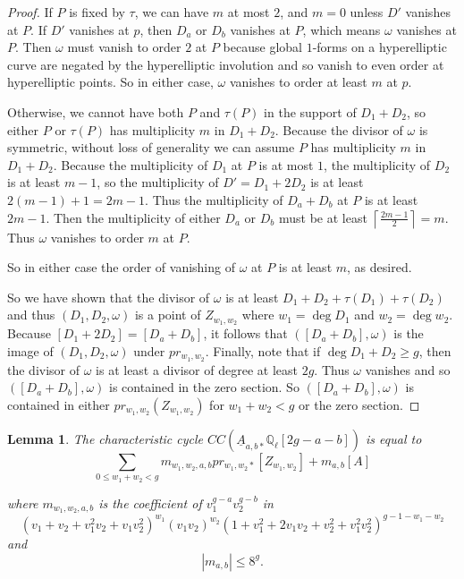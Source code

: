 \documentclass[12pt]{amsart}
\newtheorem{lemma}[theorem]{Lemma}
\theoremstyle{definition}
\theoremstyle{remark}
\begin{document}
\begin{proof}
If $P$ is fixed by $\tau$, we can have $m$ at most $2$, and $m=0$ unless $D'$ vanishes at $P$. If $D'$ vanishes at $p$, then $D_a$ or $D_b$ vanishes at $P$, which means $\omega$ vanishes at $P$. Then $\omega$ must vanish to order $2$ at $P$ because global $1$-forms on a hyperelliptic curve are negated by the hyperelliptic involution and so vanish to even order at hyperelliptic points. So in either case, $\omega$ vanishes to order at least $m$ at $p$.

Otherwise, we cannot have both $P$ and $\tau(P)$ in the support of $D_1+D_2$, so either $P$ or $\tau(P)$ has multiplicity $m$ in $D_1+D_2$. Because the divisor of $\omega$ is symmetric, without loss of generality we can assume $P$ has multiplicity $m$ in $D_1+D_2$. Because the multiplicity of $D_1$ at $P$ is at most $1$, the multiplicity of $D_2$ is at least $m-1$, so the multiplicity of $D' = D_1+2 D_2$ is at least $2(m-1)+1=2m-1$. Thus the multiplicity of $D_a+D_b$ at $P$ is at least $2m-1$. Then the multiplicity of either $D_a$ or $D_b$ must be at least $\left\lceil \frac{2m-1}{2} \right\rceil =m$. Thus $\omega$ vanishes to order $m$ at $P$.

So in either case the order of vanishing of $\omega$ at $P$ is at least $m$, as desired.

So we have shown that the divisor of $\omega$ is at least $D_1+ D_2 + \tau(D_1) + \tau(D_2) $ and thus $(D_1,D_2, \omega)$ is a point of $Z_{w_1, w_2}$ where $w_1 = \deg D_1$ and $w_2 = \deg w_2$. Because $[D_1 +2D_2 ]= [D_a+D_b]$, it follows that  $( [D_a+ D_b] ,\omega) $ is the image of $(D_1,D_2, \omega)$ under $ pr_{w_1,w_2 }$.  Finally, note that if $\deg D_1 + D_2 \geq g$, then the divisor of $\omega$ is at least a divisor of degree at least $2g$. Thus $\omega$ vanishes and so $([D_a+D_b], \omega)$ is contained in the zero section. So $([D_a+D_b],\omega)$ is contained in either $pr_{w_1,w_2} (Z_{w_1,w_2})$ for $w_1+w_2<g$ or the zero section.

\end{proof} 


\begin{lemma}\label{ts-smooth-cc} The characteristic cycle $CC ( \underline{A}_{a,b *} \mathbb Q_\ell [ 2g-a-b] )$ is equal to \[ \sum_{0 \leq w_1+ w_2 < g} m_{w_1,w_2,a,b}  pr_{w_1,w_2 *} [ Z_{w_1,w_2} ]  + m_{a,b} [ A]  \]


where $m_{w_1,w_2,a,b}$ is the coefficient of $v_1^{g-a} v_2^{g-b}$ in  \[ (v_1+ v_2+ v_1^2 v_2 + v_1 v_2^2 )^{w_1} (v_1v_2)^{w_2} ( 1  + v_1^2 + 2v_1 v_2 + v_2^2 + v_1^2 v_2^2 )^{g-1-w_1 -w_2} \]
and \[ |m_{a,b} | \leq 8^g .\]

 \end{lemma}
\end{document}
